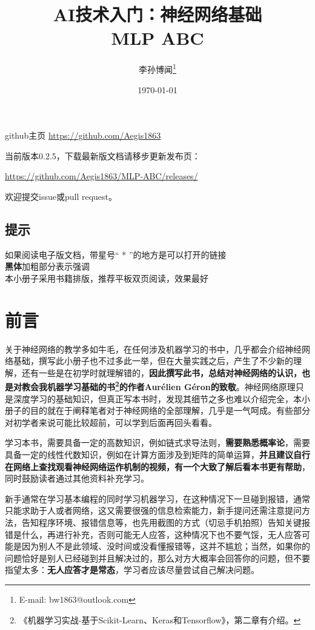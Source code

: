\documentclass[a5paper, 11pt]{ctexbook}
\title{\textbf{\huge AI技术入门：神经网络基础 \\ \Large MLP ABC}}
\author{李孙博闻\thanks{E-mail: bw1863@outlook.com}}
\date{\today}
\begin{document}
\maketitle



github主页 \href{https://github.com/Aegis1863} {https://github.com/Aegis1863}

当前版本0.2.5，下载最新版文档请移步更新发布页：

\href{https://github.com/Aegis1863/MLP-ABC/releases/}{https://github.com/Aegis1863/MLP-ABC/releases/}

欢迎提交issue或pull request。

\section*{提示}
\begin{center}
    如果阅读电子版文档，带星号`` * ''的地方是可以打开的链接 \\
    \textbf{黑体}加粗部分表示强调 \\
    本小册子采用书籍排版，推荐平板双页阅读，效果最好
\end{center}


\chapter*{前言} %


关于神经网络的教学多如牛毛，在任何涉及机器学习的书中，几乎都会介绍神经网络基础，撰写此小册子也不过多此一举，但在大量实践之后，产生了不少新的理解，还有一些是在初学时就理解错的，\textbf{因此撰写此书，总结对神经网络的认识，也是对教会我机器学习基础的书\footnote{《机器学习实战-基于Scikit-Learn、Keras和Tensorflow》，第二章有介绍。}的作者Aurélien Géron的致敬}。神经网络原理只是深度学习的基础知识，但真正写本书时，发现其细节之多也难以介绍完全，本小册子的目的就在于阐释笔者对于神经网络的全部理解，几乎是一气呵成。有些部分对初学者来说可能比较超前，可以学到后面再回头看看。

学习本书，需要具备一定的高数知识，例如链式求导法则，\textbf{需要熟悉概率论}，需要具备一定的线性代数知识，例如在计算方面涉及到矩阵的简单运算，\textbf{并且建议自行在网络上查找观看神经网络运作机制的视频，有一个大致了解后看本书更有帮助}，同时鼓励读者通过其他资料补充学习。

新手通常在学习基本编程的同时学习机器学习，在这种情况下一旦碰到报错，通常只能求助于人或者网络，这又需要很强的信息检索能力，新手提问还需注意提问方法，告知程序环境、报错信息等，也先用截图的方式（切忌手机拍照）告知关键报错是什么，再进行补充，否则可能无人应答，这种情况下也不要气馁，无人应答可能是因为别人不是此领域、没时间或没看懂报错等，这并不尴尬；当然，如果你的问题恰好是别人已经碰到并且解决过的，那么对方大概率会回答你的问题，但不要指望太多：\textbf{无人应答才是常态}，学习者应该尽量尝试自己解决问题。
\end{document}
